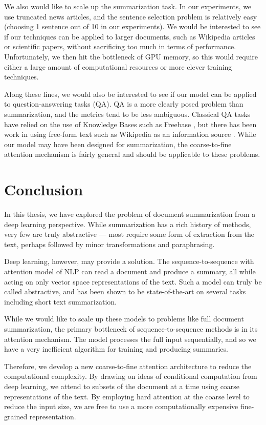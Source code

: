 \documentclass[12pt]{report}
\begin{document}
We also would like to scale up the summarization task. In our experiments, we use truncated news articles, and the sentence selection problem is relatively easy (choosing 1 sentence out of 10 in our experiments). 
We would be interested to see if our techniques can be applied to larger documents, such as Wikipedia articles or scientific papers, without sacrificing too much in terms of performance.
Unfortunately, we then hit the bottleneck of GPU memory, so this would require either a large amount of computational resources or more clever training techniques.

Along these lines, we would also be interested to see if our model can be applied to question-answering tasks (QA). QA is a more clearly posed problem than summarization, and the metrics tend to be less ambiguous.
Classical QA tasks have relied on the use of Knowledge Bases such as Freebase \citep{Bollacker2008}, but there has been work in using free-form text such as Wikipedia as an information source \citep{Miller2016}. While our model may have been designed for summarization, the coarse-to-fine attention mechanism is fairly general and should be applicable to these problems.

\chapter{Conclusion}
\label{chap:conclusion}

In this thesis, we have explored the problem of document summarization from a deep learning perspective. While summarization has a rich history of methods, very few are truly abstractive --- most require some form of extraction from the text, perhaps followed by minor transformations and paraphrasing.

Deep learning, however, may provide a solution. The sequence-to-sequence with attention model of NLP can read a document and produce a summary, all while acting on only vector space representations of the text. Such a model can truly be called abstractive, and has been shown to be state-of-the-art on several tasks including short text summarization.

While we would like to scale up these models to problems like full document summarization, the primary bottleneck of sequence-to-sequence methods is in its attention mechanism. The model processes the full input sequentially, and so we have a very inefficient algorithm for training and producing summaries.

Therefore, we develop a new coarse-to-fine attention architecture to reduce the computational complexity. By drawing on ideas of conditional computation from deep learning, we attend to subsets of the document at a time using coarse representations of the text.
By employing hard attention at the coarse level to reduce the input size, we are free to use a more computationally expensive fine-grained representation.
\end{document}
